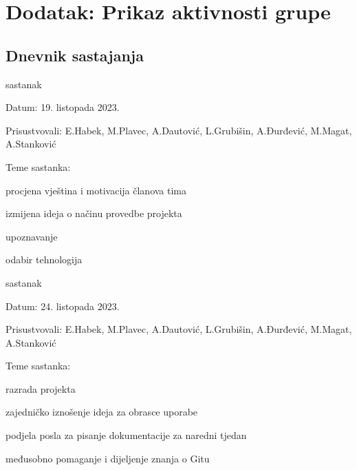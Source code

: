 \chapter*{Dodatak: Prikaz aktivnosti grupe}
		
		\section*{Dnevnik sastajanja}
		

		\begin{packed_enum}
			\item  sastanak
			
			\item[] \begin{packed_item}
				\item Datum: 19. listopada 2023.
				\item Prisustvovali: E.Habek, M.Plavec, A.Dautović, L.Grubišin, A.Đurđević, M.Magat, A.Stanković
				\item Teme sastanka:
				\begin{packed_item}
					\item procjena vještina i motivacija članova tima
					\item izmijena ideja o načinu provedbe projekta
					\item upoznavanje
					\item odabir tehnologija
				\end{packed_item}
			\end{packed_item}
			
			\item  sastanak
			\item[] \begin{packed_item}
				\item Datum: 24. listopada 2023.
				\item Prisustvovali: E.Habek, M.Plavec, A.Dautović, L.Grubišin, A.Đurđević, M.Magat, A.Stanković
				\item Teme sastanka:
				\begin{packed_item}
					\item razrada projekta
					\item zajedničko iznošenje ideja za obrasce uporabe
					\item podjela posla za pisanje dokumentacije za naredni tjedan
					\item međusobno pomaganje i dijeljenje znanja o Gitu
				\end{packed_item}
			\end{packed_item}
			

\end{packed_enum}
